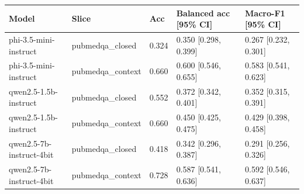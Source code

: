 \begin{tabular}{lllll}
\toprule
Model & Slice & Acc & Balanced acc [95\% CI] & Macro-F1 [95\% CI] \\
\midrule
phi-3.5-mini-instruct & pubmedqa\_closed & 0.324 & 0.350 [0.298, 0.399] & 0.267 [0.232, 0.301] \\
phi-3.5-mini-instruct & pubmedqa\_context & 0.660 & 0.600 [0.546, 0.655] & 0.583 [0.541, 0.623] \\
qwen2.5-1.5b-instruct & pubmedqa\_closed & 0.552 & 0.372 [0.342, 0.401] & 0.352 [0.315, 0.391] \\
qwen2.5-1.5b-instruct & pubmedqa\_context & 0.660 & 0.450 [0.425, 0.475] & 0.429 [0.398, 0.458] \\
qwen2.5-7b-instruct-4bit & pubmedqa\_closed & 0.418 & 0.342 [0.296, 0.387] & 0.291 [0.256, 0.326] \\
qwen2.5-7b-instruct-4bit & pubmedqa\_context & 0.728 & 0.587 [0.541, 0.636] & 0.592 [0.546, 0.637] \\
\bottomrule
\end{tabular}
